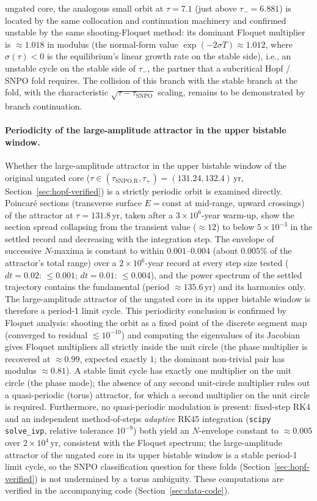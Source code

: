 \documentclass[twocolumn,10pt]{article}
\begin{document}
ungated core, the analogous small orbit at $\tau=7.1$ (just above $\tau_-=6.881$) is located by the same collocation and continuation machinery and confirmed unstable by the same shooting-Floquet method: its dominant Floquet multiplier is $\approx1.018$ in modulus (the normal-form value $\exp(-2\sigma T)\approx1.012$, where $\sigma(\tau)<0$ is the equilibrium's linear growth rate on the stable side), i.e., an unstable cycle on the stable side of $\tau_-$, the partner that a subcritical Hopf / SNPO fold requires. The collision of this branch with the stable branch at the fold, with the characteristic $\sqrt{\tau-\tau_{\text{SNPO}}}$ scaling, remains to be demonstrated by branch continuation.

\paragraph{Periodicity of the large-amplitude attractor in the upper bistable window.} Whether the large-amplitude attractor in the upper bistable window of the original ungated core ($\tau\in(\tau_{\text{SNPO,R}},\tau_+)=(131.24,132.4)$\,yr, Section~\ref{sec:hopf-verified}) is a strictly periodic orbit is examined directly. Poincar\'e sections (transverse surface $E=\text{const}$ at mid-range, upward crossings) of the attractor at $\tau=131.8$\,yr, taken after a $3\times10^6$-year warm-up, show the section spread collapsing from the transient value ($\approx12$) to below $5\times10^{-3}$ in the settled record and decreasing with the integration step. The envelope of successive $N$-maxima is constant to within $0.001$--$0.004$ (about $0.005$\% of the attractor's total range) over a $2\times10^6$-year record at every step size tested ($dt=0.02$: $\le0.001$; $dt=0.01$: $\le0.004$), and the power spectrum of the settled trajectory contains the fundamental (period $\approx135.6$\,yr) and its harmonics only. The large-amplitude attractor of the ungated core in its upper bistable window is therefore a period-1 limit cycle. This periodicity conclusion is confirmed by Floquet analysis: shooting the orbit as a fixed point of the discrete segment map (converged to residual $\lesssim10^{-10}$) and computing the eigenvalues of its Jacobian gives Floquet multipliers all strictly inside the unit circle (the phase multiplier is recovered at $\approx0.99$, expected exactly $1$; the dominant non-trivial pair has modulus $\approx0.81$). A stable limit cycle has exactly one multiplier on the unit circle (the phase mode); the absence of any second unit-circle multiplier rules out a quasi-periodic (torus) attractor, for which a second multiplier on the unit circle is required. Furthermore, no quasi-periodic modulation is present: fixed-step RK4 and an independent method-of-steps \emph{adaptive} RK45 integration (\texttt{scipy} \texttt{solve\_ivp}, relative tolerance $10^{-9}$) both yield an $N$-envelope constant to $\approx0.005$ over $2\times10^4$\,yr, consistent with the Floquet spectrum; the large-amplitude attractor of the ungated core in its upper bistable window is a stable period-1 limit cycle, so the SNPO classification question for these folds (Section~\ref{sec:hopf-verified}) is not undermined by a torus ambiguity. These computations are verified in the accompanying code (Section~\ref{sec:data-code}).
\end{document}
